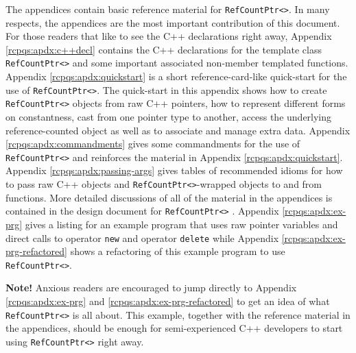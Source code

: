 \documentclass[pdf,ps2pdf,11pt]{SANDreport}
\begin{document}
The appendices contain basic reference material for
{}\texttt{Ref\-Count\-Ptr<>}.  In many respects, the appendices are
the most important contribution of this document.  For those readers
that like to see the C++ declarations right away, Appendix
{}\ref{rcpqs:apdx:c++decl} contains the C++ declarations for the
template class {}\texttt{Ref\-Count\-Ptr<>} and some important
associated non-member templated functions.  Appendix
{}\ref{rcpqs:apdx:quickstart} is a short reference-card-like
quick-start for the use of {}\texttt{Ref\-Count\-Ptr<>}.  The
quick-start in this appendix shows how to create
{}\texttt{Ref\-Count\-Ptr<>} objects from raw C++ pointers, how to
represent different forms on constantness, cast from one pointer type
to another, access the underlying reference-counted object as well as
to associate and manage extra data.  Appendix
{}\ref{rcpqs:apdx:commandments} gives some commandments for the use of
{}\texttt{Ref\-Count\-Ptr<>} and reinforces the material in Appendix
{}\ref{rcpqs:apdx:quickstart}.  Appendix
{}\ref{rcpqs:apdx:passing-args} gives tables of recommended idioms for
how to pass raw C++ objects and {}\texttt{Ref\-Count\-Ptr<>}-wrapped
objects to and from functions.  More detailed discussions of all of
the material in the appendices is contained in the design document for
{}\texttt{Ref\-Count\-Ptr<>} {}\cite{ref:RefCountPtr}.  Appendix
{}\ref{rcpqs:apdx:ex-prg} gives a listing for an example program that
uses raw pointer variables and direct calls to operator {}\texttt{new}
and operator {}\texttt{delete} while Appendix
{}\ref{rcpqs:apdx:ex-prg-refactored} shows a refactoring of this
example program to use {}\texttt{Ref\-Count\-Ptr<>}.

{}\textbf{Note!}  Anxious readers are encouraged to jump directly to
Appendix {}\ref{rcpqs:apdx:ex-prg} and
{}\ref{rcpqs:apdx:ex-prg-refactored} to get an idea of what
{}\texttt{Ref\-Count\-Ptr<>} is all about.  This example, together
with the reference material in the appendices, should be enough for
semi-experienced C++ developers to start using
{}\texttt{Ref\-Count\-Ptr<>} right away.
\end{document}
